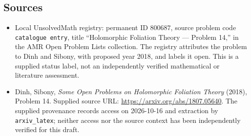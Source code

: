 \documentclass[11pt]{article}
\begin{document}
\subsection{Sources}
\begin{itemize}
\item Local UnsolvedMath registry: permanent ID \(800687\), source problem code \texttt{catalogue entry}, title ``Holomorphic Foliation Theory --- Problem 14,'' in the AMR Open Problem Lists collection. The registry attributes the problem to Dinh and Sibony, with proposed year 2018, and labels it open. This is a supplied status label, not an independently verified mathematical or literature assessment.
\item Dinh, Sibony, \emph{Some Open Problems on Holomorphic Foliation Theory} (2018), Problem 14. Supplied source URL: \url{https://arxiv.org/abs/1807.05640}. The supplied provenance records access on 2026-10-16 and extraction by \texttt{arxiv\_latex}; neither access nor the source context has been independently verified for this draft.
\end{itemize}
\end{document}
